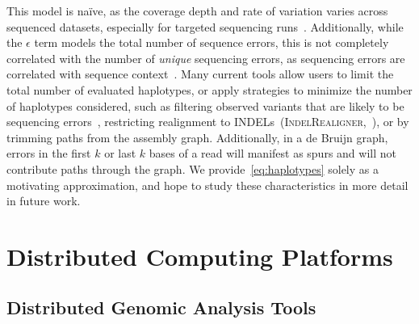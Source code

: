\documentclass[phd]{ucbthesis}
\begin{document}
This model is na\"{i}ve, as the coverage depth and rate of variation varies across sequenced datasets,
especially for targeted sequencing runs~\cite{fang14}. Additionally, while the $\epsilon$ term models the
total number of sequence errors, this is not completely correlated with the number of \emph{unique}
sequencing errors, as sequencing errors are correlated with sequence context~\cite{depristo11}. Many
current tools allow users to limit the total number of evaluated haplotypes, or apply strategies to minimize
the number of haplotypes considered, such as filtering observed variants that are likely to be sequencing
errors~\cite{garrison12}, restricting realignment to INDELs~(\textsc{IndelRealigner},~\cite{depristo11}), or
by trimming paths from the assembly graph. Additionally, in a de Bruijn graph, errors in the
first $k$ or last $k$ bases of a read will manifest as spurs and will not contribute paths through the graph. We provide~\eqref{eq:haplotypes} solely as a motivating
approximation, and hope to study these characteristics in more detail in future work.

\section{Distributed Computing Platforms}
\label{sec:distributed-computing}

\subsection{Distributed Genomic Analysis Tools}
\label{sec:distributed-genome-analysis}
\end{document}
